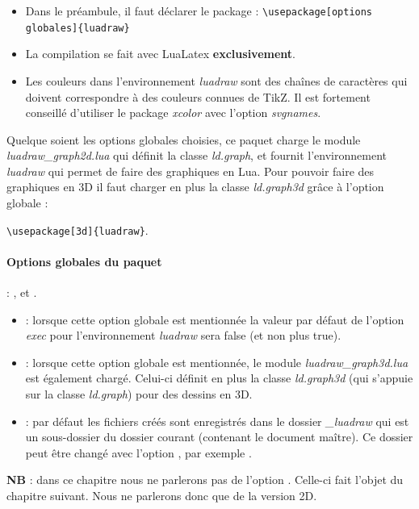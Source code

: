 \begin{itemize}
\item Dans le préambule, il faut déclarer le package \luadrawenv : \verb|\usepackage[options globales]{luadraw}|
\item La compilation se fait avec LuaLatex \textbf{exclusivement}.
\item Les couleurs dans l'environnement \emph{luadraw} sont des chaînes de caractères qui doivent correspondre à des couleurs connues de TikZ. Il est fortement conseillé d'utiliser le package \emph{xcolor} avec l'option \emph{svgnames}.
\end{itemize}

Quelque soient les options globales choisies, ce paquet charge le module \emph{luadraw\_graph2d.lua} qui définit la classe \emph{ld.graph}, et fournit l'environnement \emph{luadraw} qui permet de faire des graphiques en Lua. Pour pouvoir faire des graphiques en 3D il faut charger en plus la classe \emph{ld.graph3d} grâce à l'option globale  :\par
\hfil\verb|\usepackage[3d]{luadraw}|.\hfil

\paragraph{Options globales du paquet} : ,  et .

\begin{itemize}
    \item {} : lorsque cette option globale est mentionnée la valeur par défaut de l'option \emph{exec} pour l'environnement \emph{luadraw} sera false (et non plus true).
    \item {} : lorsque cette option globale est mentionnée, le module \emph{luadraw\_graph3d.lua} est également chargé. Celui-ci définit en plus la classe \emph{ld.graph3d} (qui s'appuie sur la classe \emph{ld.graph}) pour des dessins en 3D. 
    \item {} : par défaut les fichiers créés sont enregistrés dans le dossier \emph{\_luadraw} qui est un sous-dossier du dossier courant (contenant le document maître). Ce dossier peut être changé avec l'option , par exemple .
\end{itemize}

\noindent\textbf{NB} : dans ce chapitre nous ne parlerons pas de l'option . Celle-ci fait l'objet du chapitre suivant. Nous ne parlerons donc que de la version 2D.


